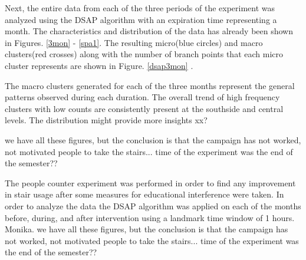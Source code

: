 Next, the entire data from each of the three periods of the experiment was analyzed using the DSAP algorithm with an expiration time representing a month. The characteristics and distribution of the data has already been shown in Figures. \ref{3mon} - \ref{spa1}. The resulting micro(blue circles) and macro clusters(red crosses) along with the number of branch points that each micro cluster represents are shown in Figure. \ref{dsap3mon} .

The macro clusters generated for each of the three months represent the general patterns observed during each duration. The overall trend of high frequency clusters with low counts are consistently present at the southside and central levels. The distribution might provide more insights xx?

we have all these figures, but the conclusion is that the campaign has not worked, not motivated people to take the stairs... time of the experiment was the end of the semester??

The people counter experiment was performed in order to find any improvement in stair usage after some measures for educational interference were taken. In order to analyze the data the DSAP algorithm was applied on each of the months before, during, and after intervention using a landmark time window of 1 hours.
Monika. we have all these figures, but the conclusion is that the campaign has not worked, not motivated people to take the stairs... time of the experiment was the end of the semester??


